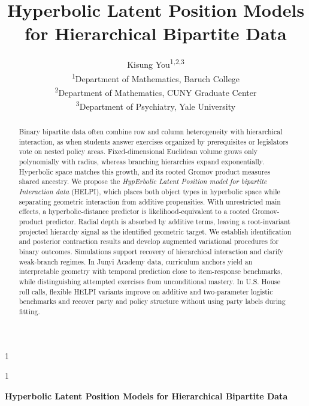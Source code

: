 \documentclass[
  12pt]{article}
\theoremstyle{definition}
\theoremstyle{plain}
\newcommand{\anon}{1}
\begin{document}
\def\spacingset#1{\renewcommand{\baselinestretch}%
{#1}\small\normalsize} \spacingset{1}




\anon
{
  \title{\bf Hyperbolic Latent Position Models for Hierarchical Bipartite Data}
  \author{Kisung You\textsuperscript{1,2,3}
  \\[0.5em]
  \textsuperscript{1}Department of Mathematics, Baruch College\\
  \textsuperscript{2}Department of Mathematics, CUNY Graduate Center\\
  \textsuperscript{3}Department of Psychiatry, Yale University}
  \maketitle
} \fi

\anon
{
  \bigskip
  \bigskip
  \bigskip
  \begin{center}
    {\LARGE\bf Hyperbolic Latent Position Models for Hierarchical Bipartite Data}
\end{center}
  \medskip
} \fi

\bigskip
\begin{abstract}
Binary bipartite data often combine row and column heterogeneity with hierarchical interaction, as when students answer exercises organized by prerequisites or legislators vote on nested policy areas.
Fixed-dimensional Euclidean volume grows only polynomially with radius, whereas branching hierarchies expand exponentially.
Hyperbolic space matches this growth, and its rooted Gromov product measures shared ancestry.
We propose the \emph{HypErbolic Latent Position model for bipartite Interaction data} (HELPI), which places both object types in hyperbolic space while separating geometric interaction from additive propensities.
With unrestricted main effects, a hyperbolic-distance predictor is likelihood-equivalent to a rooted Gromov-product predictor.
Radial depth is absorbed by additive terms, leaving a root-invariant projected hierarchy signal as the identified geometric target.
We establish identification and posterior contraction results and develop augmented variational procedures for binary outcomes.
Simulations support recovery of hierarchical interaction and clarify weak-branch regimes.
In Junyi Academy data, curriculum anchors yield an interpretable geometry with temporal prediction close to item-response benchmarks, while distinguishing attempted exercises from unconditional mastery.
In U.S. House roll calls, flexible HELPI variants improve on additive and two-parameter logistic benchmarks and recover party and policy structure without using party labels during fitting.
\end{abstract}
\end{document}
